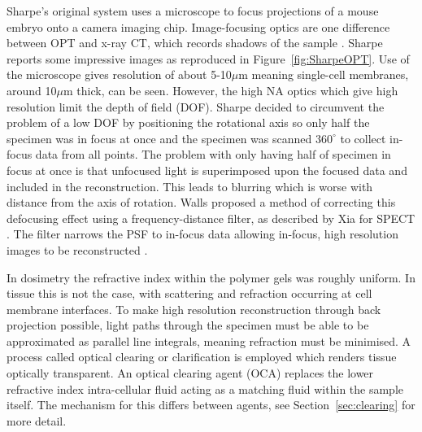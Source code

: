 \documentclass[12pt]{article}
\begin{document}
Sharpe's original system uses a microscope to focus projections of a mouse embryo onto a camera imaging chip. Image-focusing optics are one difference between OPT and x-ray CT, which records shadows of the sample \cite{Sharpe:2002jp}. Sharpe reports some impressive images as reproduced in Figure~\ref{fig:SharpeOPT}. Use of the microscope gives resolution of about 5-10$\mu$m meaning single-cell membranes, around 10$\mu$m thick, can be seen\cite{Sharpe:2002jp}. However, the high NA  optics which give high resolution limit the depth of field (DOF). Sharpe decided to circumvent the problem of a low DOF by positioning the rotational axis so only half the specimen was in focus at once and the specimen was scanned $360^{\circ}$ to collect in-focus data from all points. The problem with only having half of specimen in focus at once is that unfocused light is superimposed upon the focused data and included in the reconstruction. This leads to blurring which is worse with distance from the axis of rotation. Walls proposed a method of correcting this defocusing effect using a frequency-distance filter, as described by Xia for SPECT \cite{xia1995fourier,Walls:2007jl}. The filter narrows the PSF to in-focus data allowing in-focus, high resolution images to be reconstructed \cite{Walls:2007jl}.

	
	
In dosimetry the refractive index within the polymer gels was roughly uniform. In tissue this is not the case, with scattering and refraction occurring at cell membrane interfaces. To make high resolution reconstruction through back projection possible, light paths through the specimen must be able to  be approximated as parallel line integrals, meaning refraction must be minimised. A process called optical clearing or clarification is employed which renders tissue optically transparent. An optical clearing agent (OCA) replaces the lower refractive index intra-cellular fluid acting as a matching fluid within the sample itself. The mechanism for this differs between agents, see Section~\ref{sec:clearing} for more detail. 
\end{document}
